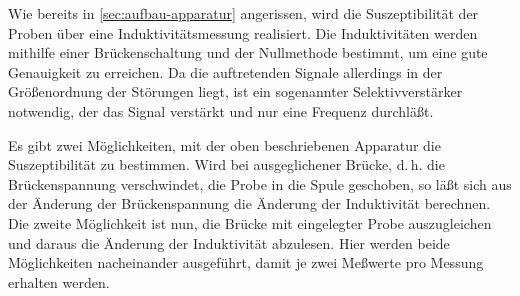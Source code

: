 Wie bereits in \cref{sec:aufbau-apparatur} angerissen, wird die
Suszeptibilität der Proben über eine Induktivitätsmessung
realisiert. Die Induktivitäten werden mithilfe einer Brückenschaltung
und der Nullmethode bestimmt, um eine gute Genauigkeit zu erreichen. Da
die auftretenden Signale allerdings in der Größenordnung der Störungen
liegt, ist ein sogenannter Selektivverstärker notwendig, der das Signal
verstärkt und nur eine Frequenz durchläßt.

Es gibt zwei Möglichkeiten, mit der oben beschriebenen Apparatur die
Suszeptibilität zu bestimmen. Wird bei ausgeglichener Brücke, d.\,h. die
Brückenspannung verschwindet, die Probe in die Spule geschoben, so läßt
sich aus der Änderung der Brückenspannung die Änderung der Induktivität
berechnen. Die zweite Möglichkeit ist nun, die Brücke mit eingelegter
Probe auszugleichen und daraus die Änderung der Induktivität abzulesen.
Hier werden beide Möglichkeiten nacheinander ausgeführt, damit je zwei
Meßwerte pro Messung erhalten werden.
